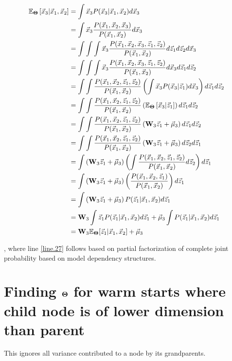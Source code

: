 \begin{align}
    \mathbb{E}_{\bold{\Theta}} \left[ \vec{x}_3 | \vec{x}_1, \vec{x}_2 \right] &= \int \vec{x}_3 P(\vec{x}_3 | \vec{x}_1, \vec{x}_2) d\vec{x}_3 \\
    &= \int \vec{x}_3 \frac{P(\vec{x}_1, \vec{x}_2, \vec{x}_3)}{P(\vec{x}_1, \vec{x}_2)} d\vec{x}_3 \\
    &= \int \int \int \vec{x}_3 \frac{ P(\vec{x}_1, \vec{x}_2, \vec{x}_3 , \vec{z}_1, \vec{z}_2) }{P(\vec{x}_1, \vec{x}_2)} d \vec{z}_1 d\vec{z}_2 d\vec{x}_3 \\ 
    &= \int \int \int \vec{x}_3 \frac{ P(\vec{x}_1, \vec{x}_2, \vec{x}_3 , \vec{z}_1, \vec{z}_2) }{P(\vec{x}_1, \vec{x}_2)} d \vec{x}_3 d\vec{z}_1 d\vec{z}_2 \\ 
    &= \int \int \frac{P(\vec{x}_1, \vec{x}_2, \vec{z}_1, \vec{z}_2)}{P(\vec{x}_1, \vec{x}_2)} \left( \int \vec{x}_3 P(\vec{x}_3 | \vec{z}_1) d \vec{x}_3 \right) d\vec{z}_1 d\vec{z}_2 \label{line.27} \\ 
    &= \int \int \frac{P(\vec{x}_1, \vec{x}_2, \vec{z}_1, \vec{z}_2)}{P(\vec{x}_1, \vec{x}_2)} \left( \mathbb{E}_{\bold{\Theta}} \left[ \vec{x}_3 | \vec{z}_1 \right] \right) d\vec{z}_1 d\vec{z}_2 \\ 
    &= \int \int \frac{P(\vec{x}_1, \vec{x}_2, \vec{z}_1, \vec{z}_2)}{P(\vec{x}_1, \vec{x}_2)} \left( \bold{W}_3 \vec{z}_1 + \vec{\mu}_3 \right) d\vec{z}_1 d\vec{z}_2 \\ 
    &= \int \int \frac{P(\vec{x}_1, \vec{x}_2, \vec{z}_1, \vec{z}_2)}{P(\vec{x}_1, \vec{x}_2)}
      \left( \bold{W}_3 \vec{z}_1 + \vec{\mu}_3 \right) d\vec{z}_2 d\vec{z}_1  \\ 
    &= \int \left( \bold{W}_3 \vec{z}_1 + \vec{\mu}_3 \right) \left( \int \frac{P(\vec{x}_1, \vec{x}_2, \vec{z}_1, \vec{z}_2)}{P(\vec{x}_1, \vec{x}_2)} d\vec{z}_2 \right) d\vec{z}_1 \\ 
    &= \int \left( \bold{W}_3 \vec{z}_1 + \vec{\mu}_3 \right) \left( \frac{P(\vec{x}_1, \vec{x}_2, \vec{z}_1)}{P(\vec{x}_1, \vec{x}_2)} \right) d\vec{z}_1 \\     
    &= \int \left( \bold{W}_3 \vec{z}_1 + \vec{\mu}_3 \right) P(\vec{z}_1 | \vec{x}_1, \vec{x}_2) d\vec{z}_1 \\
    &= \bold{W}_3 \int \vec{z}_1 P(\vec{z}_1 | \vec{x}_1, \vec{x}_2)  d \vec{z}_1 + \vec{\mu}_3 \int P(\vec{z}_1 | \vec{x}_1, \vec{x}_2) d \vec{z}_1 \\ 
    &= \bold{W}_3 \mathbb{E}_{\bold{\Theta}} [\vec{z}_1 | \vec{x}_1, \vec{x}_2] + \vec{\mu}_3
\end{align}

, where line \ref{line.27} follows based on partial factorization of
complete joint probability based on model dependency structures.

\pagebreak

\section{Finding $\bold{\Theta}$ for warm starts where child node is of
  lower dimension than parent}

This ignores all variance contributed to a node by its grandparents. \\

